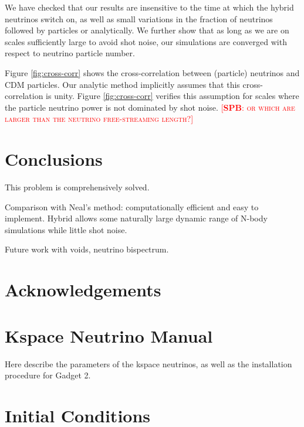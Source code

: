 \documentclass[useAMS, usenatbib]{mnras}
\newcommand{\spb}[1]{{\textsc{\textcolor{red}{[{\bf SPB}: #1]}}}}
\begin{document}
We have checked that our results are insensitive to the time at which the hybrid neutrinos switch on,
as well as small variations in the fraction of neutrinos followed by particles or analytically. We further show that as long as we are on scales sufficiently large to avoid shot noise, our simulations are converged with respect to neutrino particle number.

Figure \ref{fig:cross-corr} shows the cross-correlation between (particle) neutrinos and CDM particles. Our analytic method implicitly assumes that this cross-correlation is unity. Figure \ref{fig:cross-corr} verifies this assumption for scales where the particle neutrino power is not dominated by shot noise. \spb{or which are larger than the neutrino free-streaming length?}

\section{Conclusions}
\label{sec:conclusion}

This problem is comprehensively solved.

Comparison with Neal's method:
computationally efficient and easy to implement.
Hybrid allows some naturally large dynamic range of N-body simulations while little shot noise.

Future work with voids, neutrino bispectrum.

\section*{Acknowledgements}

\appendix

\section{Kspace Neutrino Manual}
\label{sec:manual}

Here describe the parameters of the kspace neutrinos,
as well as the installation procedure for Gadget 2.

\section{Initial Conditions}
\label{sec:initcond}
\end{document}
